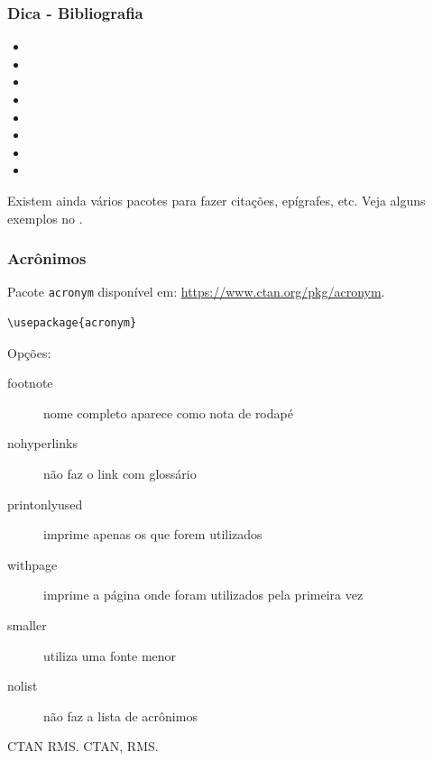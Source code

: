 \begin{frame}
\frametitle{Dica - Bibliografia}

\begin{itemize}
 \item {}
 \item {}
 \item {}
 \item {}
 \item {}
 \item {} 
 \item {}
 \item {}
\end{itemize}

\vspace{3ex}
Existem ainda vários pacotes para fazer citações, epígrafes, etc.
Veja alguns exemplos no .

\end{frame}



\begin{frame}
\frametitle{Acrônimos}

Pacote \texttt{acronym} disponível em: \url{https://www.ctan.org/pkg/acronym}.

\begin{verbatim}
\usepackage{acronym}
\end{verbatim}



Opções:
\begin{description}
\item[footnote] nome completo aparece como nota de rodapé
\item[nohyperlinks] não faz o link com glossário 
\item[printonlyused] imprime apenas os que forem utilizados
\item[withpage] imprime a página onde foram utilizados pela primeira vez
\item[smaller] utiliza uma fonte menor
\item[nolist] não faz a lista de acrônimos
\end{description}


\begin{LTXexample}
\begin{acronym}
\end{acronym}

\lipsum[1][1-2] \ac{CTAN} \lipsum[1][3] \ac{RMS}.
\lipsum[1][4] \ac{CTAN}, \lipsum[1][5] \ac{RMS}.
\end{LTXexample}

\end{frame}

